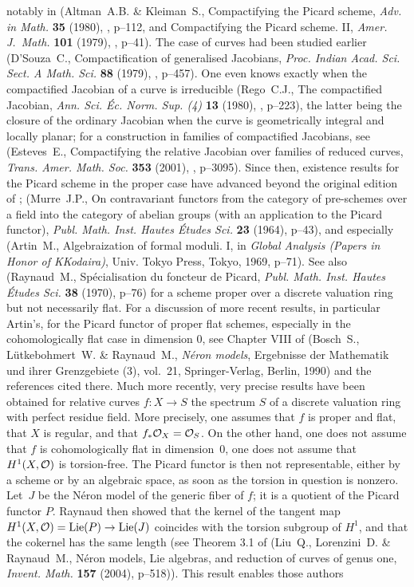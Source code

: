 \begin{remarques}
notably in (Altman~A.B. \& Kleiman~S., {\og Compactifying the Picard scheme\fg}, \emph{Adv. in Math.} \textbf{35} (1980), , p--112, and {\og Compactifying the Picard scheme. II\fg}, \emph{Amer. J.~Math.} \textbf{101} (1979), , p--41). The case of curves had been studied earlier (D'Souza~C., {\og Compactification of generalised Jacobians\fg}, \emph{Proc. Indian Acad. Sci. Sect. A Math. Sci.} \textbf{88} (1979), , p--457). One even knows exactly when the compactified Jacobian of a curve is irreducible (Rego~C.J., {\og The compactified Jacobian\fg}, \emph{Ann. Sci. \'Ec. Norm. Sup. (4)} \textbf{13} (1980), , p--223), the latter being the closure of the ordinary Jacobian when the curve is geometrically integral and locally planar; for a construction in families of compactified Jacobians, see (Esteves~E., {\og Compactifying the relative Jacobian over families of reduced curves\fg}, \emph{Trans. Amer. Math. Soc.} \textbf{353} (2001), , p--3095). Since then, existence results for the Picard scheme in the proper case have advanced beyond the original edition of ; \cf (Murre~J.P., {\og On contravariant functors from the category of pre-schemes over a field into the category of abelian groups (with an application to the Picard functor)\fg}, \emph{Publ. Math. Inst. Hautes \'Etudes Sci.} \textbf{23} (1964), p--43), and especially (Artin~M., {\og Algebraization of formal moduli. I\fg}, in \emph{Global Analysis (Papers in Honor of K\ptbl Kodaira)}, Univ. Tokyo Press, Tokyo, 1969, p--71). See also (Raynaud~M., {\og Sp\'ecialisation du foncteur de Picard\fg}, \emph{Publ. Math. Inst. Hautes \'Etudes Sci.} \textbf{38} (1970), p--76) for a scheme proper over a discrete valuation ring but not necessarily flat. For a discussion of more recent results, in particular Artin's, for the Picard functor of proper flat schemes, especially in the cohomologically flat case in dimension $0$, see Chapter VIII of (Bosch~S., L\"utkebohmert~W. \& Raynaud~M., \emph{N\'eron models}, Ergebnisse der Mathematik und ihrer Grenzgebiete (3), vol.~21, Springer-Verlag, Berlin, 1990) and the references cited there. Much more recently, very precise results have been obtained for relative curves $f:X\to S$  the spectrum $S$ of a discrete valuation ring with perfect residue field. More precisely, one assumes that $f$ is proper and flat, that $X$ is regular, and that $f_*\mathcal O_X=\mathcal O_S$. On the other hand, one does not assume that $f$ is cohomologically flat in dimension~$0$, \ie one does not assume that $H^1(X,\mathcal O)$ is torsion-free. The Picard functor is then not representable, either by a scheme or by an algebraic space, as soon as the torsion in question is nonzero. Let~$J$ be the N\'eron model of the generic fiber of $f$; it is a quotient of the Picard functor $P$. Raynaud then showed that the kernel of the tangent map $H^1(X,\mathcal O)=\mathrm{Lie}(P)\to\mathrm{Lie}(J)$ coincides with the torsion subgroup of $H^1$, and that the cokernel has the same length (see Theorem 3.1 of (Liu~Q., Lorenzini~D. \& Raynaud~M., {\og N\'eron models, Lie algebras, and reduction of curves of genus one\fg}, \emph{Invent. Math.} \textbf{157} (2004), p--518)). This result enables those authors 
\end{remarques}
